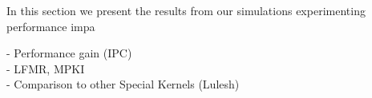 In this section we present the results from our simulations experimenting performance impa



-	Performance gain (IPC) \\
-	LFMR, MPKI \\
-	Comparison to other Special Kernels (Lulesh)





\begin{figure}[!th]
 \centering

  
  

\end{figure}
